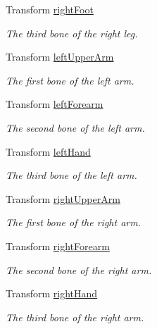 \begin{DoxyCompactItemize}
Transform \mbox{\hyperlink{class_root_motion_1_1_biped_references_ab1434314e0c85dac39247f9f3dbd57d4}{right\+Foot}}
\begin{DoxyCompactList}\small\item\em The third bone of the right leg. \end{DoxyCompactList}\item 
Transform \mbox{\hyperlink{class_root_motion_1_1_biped_references_afb1b13f2e8f216e7c7217762aa225f6a}{left\+Upper\+Arm}}
\begin{DoxyCompactList}\small\item\em The first bone of the left arm. \end{DoxyCompactList}\item 
Transform \mbox{\hyperlink{class_root_motion_1_1_biped_references_a5b248a0fe60cabe4e8e474a3b021571c}{left\+Forearm}}
\begin{DoxyCompactList}\small\item\em The second bone of the left arm. \end{DoxyCompactList}\item 
Transform \mbox{\hyperlink{class_root_motion_1_1_biped_references_a0d28263f5680784a76ea79c2f9c9a251}{left\+Hand}}
\begin{DoxyCompactList}\small\item\em The third bone of the left arm. \end{DoxyCompactList}\item 
Transform \mbox{\hyperlink{class_root_motion_1_1_biped_references_a255db332585a13c4e6d08602a74fb4ac}{right\+Upper\+Arm}}
\begin{DoxyCompactList}\small\item\em The first bone of the right arm. \end{DoxyCompactList}\item 
Transform \mbox{\hyperlink{class_root_motion_1_1_biped_references_aed7973911fcca268a3d185954ec198f3}{right\+Forearm}}
\begin{DoxyCompactList}\small\item\em The second bone of the right arm. \end{DoxyCompactList}\item 
Transform \mbox{\hyperlink{class_root_motion_1_1_biped_references_ad6fa2cc62f62b81150f4d5ef0217be72}{right\+Hand}}
\begin{DoxyCompactList}\small\item\em The third bone of the right arm. \end{DoxyCompactList}\item 

\end{DoxyCompactItemize}
